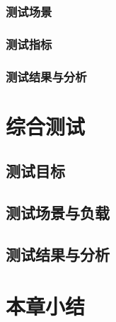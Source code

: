    \subsubsection{测试场景}
    \subsubsection{测试指标}
    \subsubsection{测试结果与分析}

\section{综合测试}
\subsection{测试目标}
\subsection{测试场景与负载}
\subsection{测试结果与分析}

\section{本章小结}
